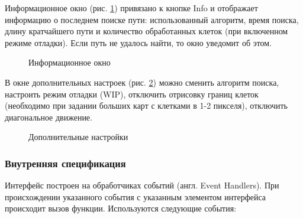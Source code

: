 Информационное окно (рис. \ref{info}) привязано к кнопке Info и отображает информацию о последнем поиске пути: использованный алгоритм, время поиска, длину кратчайшего пути и количество обработанных клеток (при включенном режиме отладки). Если путь не удалось найти, то окно уведомит об этом.

\begin{figure}[h]
\caption{Информационное окно}
\label{info}
\end{figure}

В окне дополнительных настроек (рис. \ref{sett}) можно сменить алгоритм поиска, настроить режим отладки (WIP), отключить отрисовку границ клеток (необходимо при задании больших карт с клетками в 1-2 пикселя), отключить диагональное движение.

\begin{figure}[h]
\caption{Дополнительные настройки}
\label{sett}
\end{figure}


\subsubsection{Внутренняя спецификация}
Интерфейс построен на обработчиках событий (англ. Event Handlers). При происхождении указанного события с указанным элементом интерфейса происходит вызов функции. Используются следующие события:

